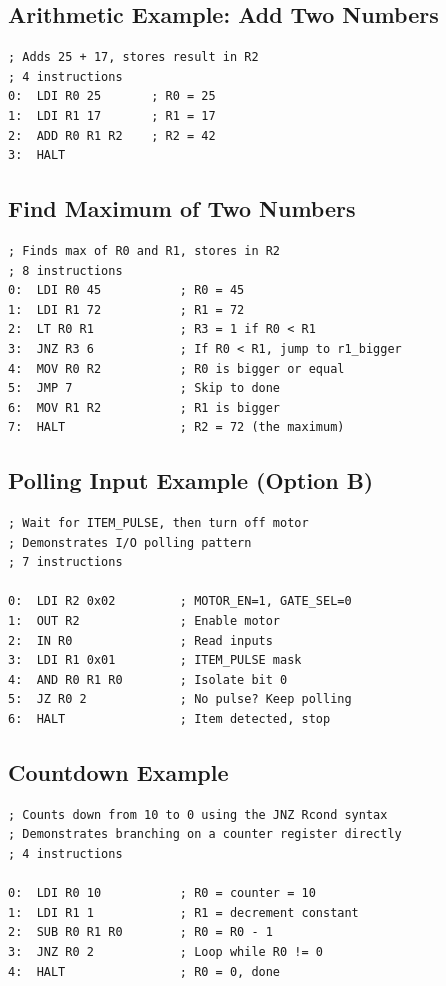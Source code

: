 \documentclass[11pt,a4paper]{article}
\begin{document}
\subsection{Arithmetic Example: Add Two Numbers}

\begin{lstlisting}
; Adds 25 + 17, stores result in R2
; 4 instructions
0:  LDI R0 25       ; R0 = 25
1:  LDI R1 17       ; R1 = 17
2:  ADD R0 R1 R2    ; R2 = 42
3:  HALT
\end{lstlisting}

\subsection{Find Maximum of Two Numbers}

\begin{lstlisting}
; Finds max of R0 and R1, stores in R2
; 8 instructions
0:  LDI R0 45           ; R0 = 45
1:  LDI R1 72           ; R1 = 72
2:  LT R0 R1            ; R3 = 1 if R0 < R1
3:  JNZ R3 6            ; If R0 < R1, jump to r1_bigger
4:  MOV R0 R2           ; R0 is bigger or equal
5:  JMP 7               ; Skip to done
6:  MOV R1 R2           ; R1 is bigger
7:  HALT                ; R2 = 72 (the maximum)
\end{lstlisting}

\subsection{Polling Input Example (Option B)}

\begin{lstlisting}
; Wait for ITEM_PULSE, then turn off motor
; Demonstrates I/O polling pattern
; 7 instructions

0:  LDI R2 0x02         ; MOTOR_EN=1, GATE_SEL=0
1:  OUT R2              ; Enable motor
2:  IN R0               ; Read inputs
3:  LDI R1 0x01         ; ITEM_PULSE mask
4:  AND R0 R1 R0        ; Isolate bit 0
5:  JZ R0 2             ; No pulse? Keep polling
6:  HALT                ; Item detected, stop
\end{lstlisting}

\subsection{Countdown Example}

\begin{lstlisting}
; Counts down from 10 to 0 using the JNZ Rcond syntax
; Demonstrates branching on a counter register directly
; 4 instructions

0:  LDI R0 10           ; R0 = counter = 10
1:  LDI R1 1            ; R1 = decrement constant
2:  SUB R0 R1 R0        ; R0 = R0 - 1
3:  JNZ R0 2            ; Loop while R0 != 0
4:  HALT                ; R0 = 0, done
\end{lstlisting}
\end{document}
